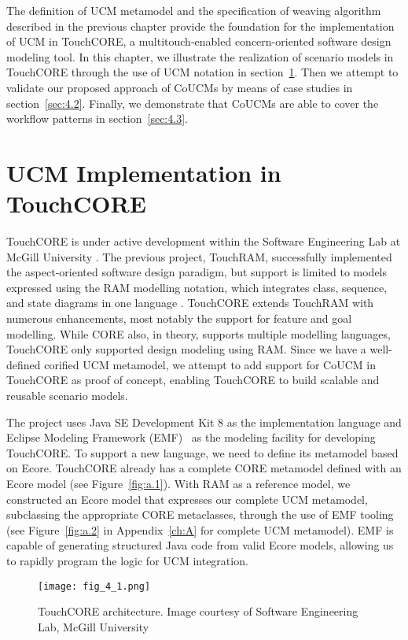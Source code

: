 The definition of UCM metamodel and the specification of weaving algorithm described in the previous chapter provide the foundation for the implementation of UCM in TouchCORE, a multitouch-enabled concern-oriented software design modeling tool. In this chapter, we illustrate the realization of scenario models in TouchCORE through the use of UCM notation in section~\ref{sec:4.1}. Then we attempt to validate our proposed approach of CoUCMs by means of case studies in section~\ref{sec:4.2}. Finally, we demonstrate that CoUCMs are able to cover the workflow patterns in section~\ref{sec:4.3}.

\section{UCM Implementation in TouchCORE} \label{sec:4.1}

TouchCORE is under active development within the Software Engineering Lab at McGill University \cite{sel2018touchcore}. The previous project, TouchRAM, successfully implemented the aspect-oriented software design paradigm, but support is limited to models expressed using the RAM modelling notation, which integrates class, sequence, and state diagrams in one language \cite{al2012touchram, schottle2014touchram}. TouchCORE extends TouchRAM with numerous enhancements, most notably the support for feature and goal modelling. While CORE also, in theory, supports multiple modelling languages, TouchCORE only supported design modeling using RAM. Since we have a well-defined corified UCM metamodel, we attempt to add support for CoUCM in TouchCORE as proof of concept, enabling TouchCORE to build scalable and reusable scenario models.

The project uses Java SE Development Kit 8 as the implementation language and Eclipse Modeling Framework (EMF)~\cite{steinberg2008emf} as the modeling facility for developing TouchCORE. To support a new language, we need to define its metamodel based on Ecore. TouchCORE already has a complete CORE metamodel defined with an Ecore model (see Figure~\ref{fig:a.1}). With RAM as a reference model, we constructed an Ecore model that expresses our complete UCM metamodel, subclassing the appropriate CORE metaclasses, through the use of EMF tooling (see Figure~\ref{fig:a.2} in Appendix~\ref{ch:A} for complete UCM metamodel). EMF is capable of generating structured Java code from valid Ecore models, allowing us to rapidly program the logic for UCM integration.

\begin{figure}
	\centering
	\texttt{[image: fig\_4\_1.png]}
	\caption[TouchCORE architecture]{TouchCORE architecture. Image courtesy of Software Engineering Lab, McGill University}
	\label{fig:4.1}
\end{figure}

